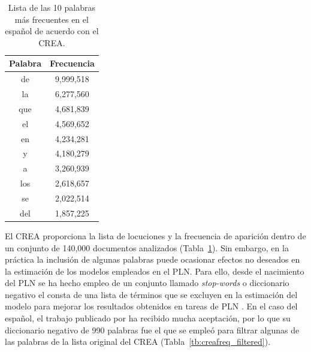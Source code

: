 \begin{table}[h]
	\caption{Lista de las 10 palabras más frecuentes en el español de acuerdo con el CREA.}
	\label{tb:creafreq}
	\centering
	\begin{tabular}{|c|c|}
		\hline
		\textbf{Palabra} & \textbf{Frecuencia} \\ \hline
		de               & 9,999,518           \\ \hline
		la               & 6,277,560           \\ \hline
		que              & 4,681,839           \\ \hline
		el               & 4,569,652           \\ \hline
		en               & 4,234,281           \\ \hline
		y                & 4,180,279           \\ \hline
		a                & 3,260,939           \\ \hline
		los              & 2,618,657           \\ \hline
		se               & 2,022,514           \\ \hline
		del              & 1,857,225           \\ \hline
	\end{tabular}
\end{table}

El CREA proporciona la lista de locuciones y la frecuencia de aparición dentro de un conjunto de 140,000 documentos analizados (Tabla~\ref{tb:creafreq}). Sin embargo, en la práctica la inclusión de algunas palabras puede ocasionar efectos no deseados en la estimación de los modelos empleados en el PLN. Para ello, desde el nacimiento del PLN se ha hecho empleo de un conjunto llamado \textit{stop-words} o diccionario negativo el consta de una lista de términos que se excluyen en la estimación del modelo para mejorar los resultados obtenidos en tareas de PLN \citep{fox1989stop}. En el caso del español, el trabajo publicado por \cite{stopwords_es} ha recibido mucha aceptación, por lo que su diccionario negativo de 990 palabras fue el que se empleó para filtrar algunas de las palabras de la lista original del CREA (Tabla~\ref{tb:creafreq_filtered}).

